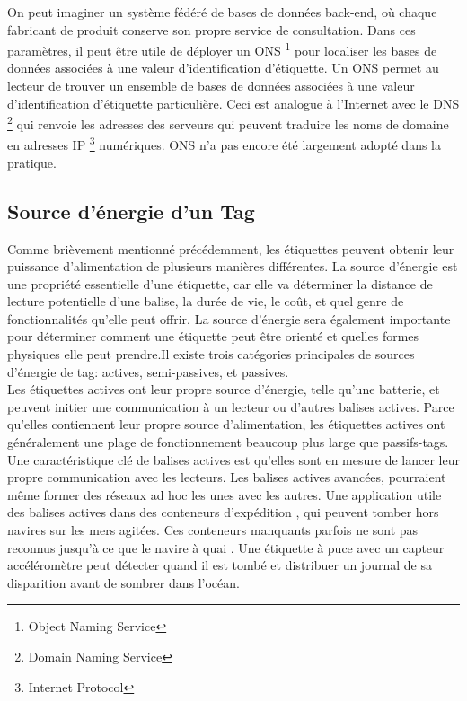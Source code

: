 \documentclass[11pt, a4paper, twoside]{book}
\begin{document}
On peut imaginer un système fédéré de bases de données back-end, où chaque fabricant de produit conserve son propre service de consultation. Dans ces paramètres, il peut être utile de déployer un ONS \footnote{Object Naming Service} pour localiser les bases de données associées à une valeur d'identification d'étiquette. Un ONS permet au lecteur de trouver un ensemble de bases de données associées à une valeur d'identification d'étiquette particulière. Ceci est analogue à l'Internet avec le DNS \footnote{Domain Naming Service} qui renvoie les adresses des serveurs qui peuvent traduire les noms de domaine en adresses IP \footnote{Internet Protocol} numériques. ONS n'a pas encore été largement adopté dans la pratique.
\subsection{Source d'énergie d'un Tag}
Comme brièvement mentionné précédemment, les étiquettes peuvent obtenir leur puissance d'alimentation de plusieurs manières différentes. La source d'énergie est une propriété essentielle d'une étiquette, car elle va déterminer la distance de lecture potentielle d'une balise, la durée de vie, le coût, et quel genre de fonctionnalités qu'elle peut offrir. La source d'énergie sera également importante pour déterminer comment une étiquette peut être orienté et quelles formes physiques elle peut prendre.Il existe trois catégories principales de sources d'énergie de tag: actives, semi-passives, et passives.\\

 Les étiquettes actives ont leur propre source d'énergie, telle qu'une batterie, et peuvent initier une communication à un lecteur ou d'autres balises actives. Parce qu'elles contiennent leur propre source d'alimentation, les étiquettes actives ont généralement une plage de fonctionnement beaucoup plus large que passifs-tags. Une caractéristique clé de balises actives est qu'elles sont en mesure de lancer leur propre communication avec les lecteurs. Les balises actives avancées, pourraient même former des réseaux ad hoc les unes avec les autres. Une application utile des balises actives dans des conteneurs d'expédition , qui peuvent tomber hors navires sur les mers agitées. Ces conteneurs manquants parfois ne sont pas reconnus jusqu'à ce que le navire à quai . Une étiquette à puce avec un capteur accéléromètre peut détecter quand il est tombé et distribuer un journal de sa disparition avant de sombrer dans l'océan.\\
\end{document}
